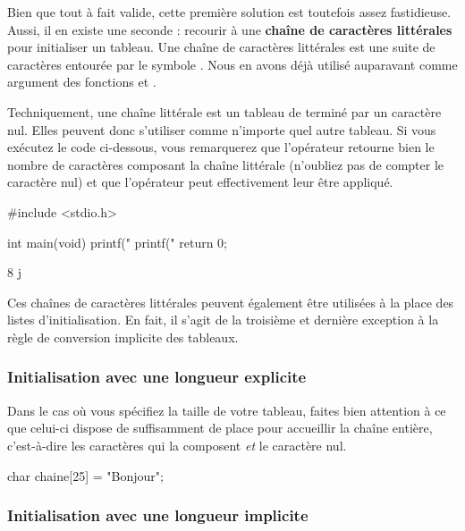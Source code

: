 Bien que tout à fait valide, cette première solution est toutefois assez
fastidieuse. Aussi, il en existe une seconde : recourir à une
\textbf{chaîne de caractères littérales} pour initialiser un tableau.
Une chaîne de caractères littérales est une suite de caractères entourée
par le symbole . Nous en avons déjà utilisé auparavant comme
argument des fonctions  et .

Techniquement, une chaîne littérale est un tableau de 
terminé par un caractère nul. Elles peuvent donc s'utiliser comme
n'importe quel autre tableau. Si vous exécutez le code ci-dessous, vous
remarquerez que l'opérateur  retourne bien le nombre de
caractères composant la chaîne littérale (n'oubliez pas de compter le
caractère nul) et que l'opérateur \mybox{{[}{]}} peut effectivement
leur être appliqué.

\begin{C}
#include <stdio.h>


int main(void)
{
    printf("%
    printf("%
    return 0;
}
\end{C}

\begin{C}
8
j
\end{C}

Ces chaînes de caractères littérales peuvent également être utilisées à
la place des listes d'initialisation. En fait, il s'agit de la troisième
et dernière exception à la règle de conversion implicite des tableaux.

\subsubsection{Initialisation avec une longueur explicite}
\label{initialisation-avec-une-longueur-explicite-4}

Dans le cas où vous spécifiez la taille de votre tableau, faites bien
attention à ce que celui-ci dispose de suffisamment de place pour
accueillir la chaîne entière, c'est-à-dire les caractères qui la
composent \emph{et} le caractère nul.

\begin{C}
char chaine[25] = "Bonjour";
\end{C}

\subsubsection{Initialisation avec une longueur implicite}
\label{initialisation-avec-une-longueur-implicite-4}

